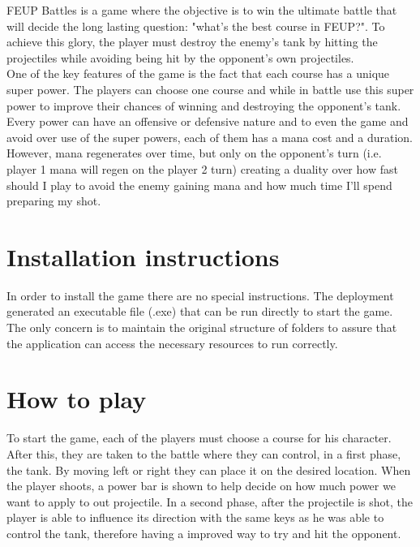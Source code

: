 \documentclass[11pt,a4paper]{report}
\begin{document}
FEUP Battles is a game where the objective is to win the ultimate battle that will decide the long lasting question: "what's the best course in FEUP?". 
To achieve this glory, the player must destroy the enemy's tank by hitting the projectiles while avoiding being hit by the opponent's own projectiles. \\

One of the key features of the game is the fact that each course has a unique super power. The players can choose one course and while in battle use this super power to improve their chances of winning and destroying the opponent's tank. Every power can have an offensive or defensive nature and to even the game and avoid over use of the super powers, each of them has a mana cost and a duration. \\

However, mana regenerates over time, but only on the opponent's turn (i.e. player 1 mana will regen on the player 2 turn) creating a duality over how fast should I play to avoid the enemy gaining mana and how much time I'll spend preparing my shot.

\chapter{Installation instructions}

In order to install the game there are no special instructions. The deployment generated an executable file (.exe) that can be run directly to start the game. \\

The only concern is to maintain the original structure of folders to assure that the application can access the necessary resources to run correctly.

\chapter{How to play}

To start the game, each of the players must choose a course for his character. After this, they are taken to the battle where they can control, in a first phase, the tank. By moving left or right they can place it on the desired location. When the player shoots, a power bar is shown to help decide on how much power we want to apply to out projectile. In a second phase, after the projectile is shot, the player is able to influence its direction with the same keys as he was able to control the tank, therefore having a improved way to try and hit the opponent. \\
\end{document}
